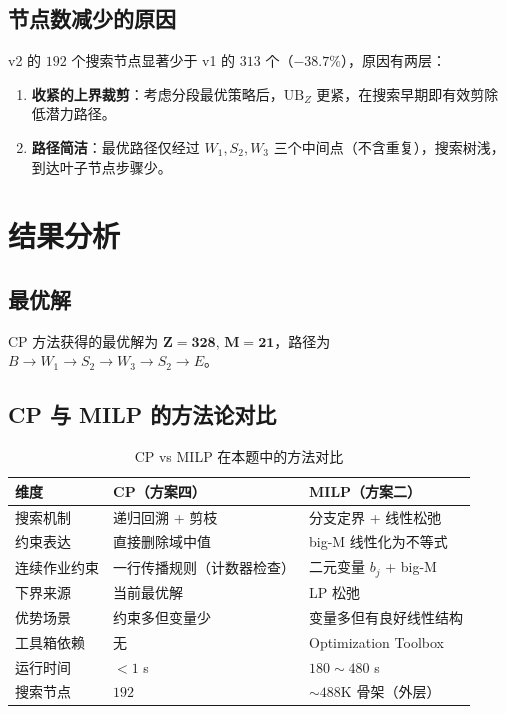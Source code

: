 \documentclass[12pt,a4paper]{ctexart}
\theoremstyle{definition}
\begin{document}
\subsection{节点数减少的原因}

v2 的 $192$ 个搜索节点显著少于 v1 的 $313$ 个（$-38.7\%$），原因有两层：

\begin{enumerate}
  \item \textbf{收紧的上界裁剪}：考虑分段最优策略后，$\text{UB}_Z$ 更紧，在搜索早期即有效剪除低潜力路径。

  \item \textbf{路径简洁}：最优路径仅经过 $W_1,S_2,W_3$ 三个中间点（不含重复），搜索树浅，到达叶子节点步骤少。
\end{enumerate}

\section{结果分析}

\subsection{最优解}

CP 方法获得的最优解为 $\mathbf{Z=328}$, $\mathbf{M=21}$，路径为 $B\to W_1\to S_2\to W_3\to S_2\to E$。

\subsection{CP 与 MILP 的方法论对比}

\begin{table}[H]
  \centering
  \caption{CP vs MILP 在本题中的方法对比}
  \begin{tabular}{p{2.5cm}p{4.5cm}p{4.5cm}}
    \toprule
    维度 & CP（方案四） & MILP（方案二） \\
    \midrule
    搜索机制 & 递归回溯 + 剪枝 & 分支定界 + 线性松弛 \\
    约束表达 & 直接删除域中值 & big-M 线性化为不等式 \\
    连续作业约束 & 一行传播规则（计数器检查） & 二元变量 $b_j$ + big-M \\
    下界来源 & 当前最优解 & LP 松弛 \\
    优势场景 & 约束多但变量少 & 变量多但有良好线性结构 \\
    工具箱依赖 & 无 & Optimization Toolbox \\
    运行时间 & $<1$ s & $180\sim 480$ s \\
    搜索节点 & $192$ & $\sim 488$K 骨架（外层） \\
    \bottomrule
  \end{tabular}
\end{table}
\end{document}
